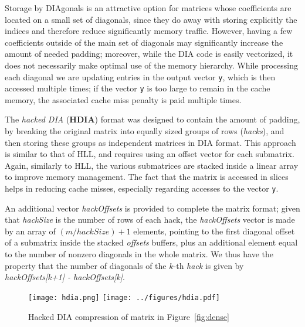 Storage by DIAgonals is an attractive option for matrices whose
coefficients are located on a small set of diagonals, since they do
away with storing explicitly the indices and therefore reduce
significantly memory traffic. However, having a few coefficients
outside of the main set of diagonals may  significantly increase the
amount of needed padding; moreover, while the DIA code is easily
vectorized, it does not necessarily make optimal use of the memory
hierarchy. While processing each diagonal we are updating entries in
the output vector \verb|y|, which is then accessed multiple times; if 
the vector \verb|y| is too large to remain in the cache memory, the
associated cache miss penalty is paid multiple times. 

The \textit{hacked DIA} (\textbf{HDIA}) format was designed to contain
the amount of padding, by  breaking  the original matrix
into equally sized groups of rows (\textit{hacks}), and then storing
these groups as independent matrices in DIA format. This approach is
similar to that of HLL, and requires using an offset vector for each
submatrix. Again, similarly to HLL, the various submatrices are
stacked inside a linear array to improve memory management. The fact
that the matrix is accessed in slices helps in reducing cache misses,
especially regarding accesses to the %
vector \verb|y|.  


An additional vector \textit{hackOffsets} is provided to complete
the matrix format; given  that \textit{hackSize} is the number of rows of each hack,
the \textit{hackOffsets} vector is made by an array of
$(m/hackSize)+1$ elements,  pointing to the first diagonal offset of a
submatrix inside the stacked \textit{offsets} buffers, plus an
additional element equal to the number of nonzero diagonals in the whole matrix. 
We thus have the property that  
the number of diagonals of the $k$-th \textit{hack} is given by
\textit{hackOffsets[k+1] - hackOffsets[k]}.  

\begin{figure}[ht]
	\centering
\ifcase\pdfoutput
  \texttt{[image: hdia.png]}
\or
  \texttt{[image: ../figures/hdia.pdf]}
\fi
	\caption{Hacked DIA compression of matrix in Figure~\ref{fig:dense}}
	\label{fig:hdia}
\end{figure} 


